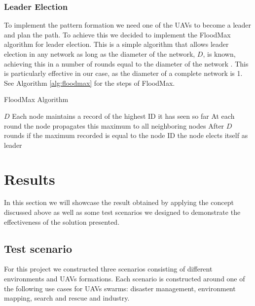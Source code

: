 \subsection{Leader Election}

To implement the pattern formation we need one of the UAVs to become a leader and plan the path. 
To achieve this we decided to implement the FloodMax algorithm for leader election. This is a 
simple algorithm that allows leader election in any network as long as the diameter of the network, $D$,
is known, achieving this in a number of rounds equal to the diameter of the network \autocite{EK23}. 
This is particularly effective in our case, as the diameter of a complete network is 1. See Algorithm
\ref{alg:floodmax} for the steps of FloodMax.

\begin{algorithm}
	\algrenewcommand{}
	\algrenewcommand{}
	\caption{FloodMax Algorithm}\label{alg:floodmax}
	\begin{algorithmic}[1]
		\Require $D$
		\State Each node maintains a record of the highest ID it has seen so far 
		\State At each round the node propagates this maximum to all neighboring nodes
		\State After $D$ rounds if the maximum recorded is equal to the node ID the node elects itself as leader
	\end{algorithmic}
\end{algorithm}


\chapter{Results}

In this section we will showcase the result obtained by applying the concept discussed above as well as some test
scenarios we designed to demonstrate the effectiveness of the solution presented. 

\section{Test scenario}

For this project we constructed three scenarios consisting of different environments and UAVs formations. Each 
scenario is constructed around one of the following use cases for UAVs swarms: disaster management, environment
mapping, search and rescue and industry.

